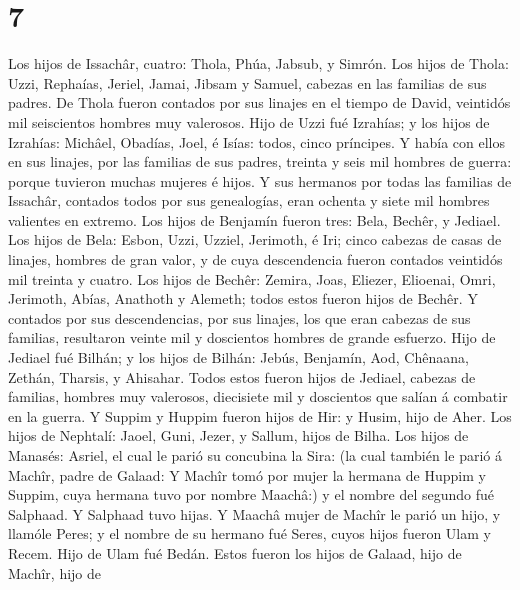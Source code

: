 \hypertarget{section-6}{%
\section{7}\label{section-6}}

 Los hijos de Issachâr, cuatro: Thola, Phúa, Jabsub, y
Simrón.  Los hijos de Thola: Uzzi, Rephaías, Jeriel,
Jamai, Jibsam y Samuel, cabezas en las familias de sus padres. De Thola
fueron contados por sus linajes en el tiempo de David, veintidós mil
seiscientos hombres muy valerosos.  Hijo de Uzzi fué
Izrahías; y los hijos de Izrahías: Michâel, Obadías, Joel, é Isías:
todos, cinco príncipes.  Y había con ellos en sus linajes,
por las familias de sus padres, treinta y seis mil hombres de guerra:
porque tuvieron muchas mujeres é hijos.  Y sus hermanos
por todas las familias de Issachâr, contados todos por sus genealogías,
eran ochenta y siete mil hombres valientes en extremo. 
Los hijos de Benjamín fueron tres: Bela, Bechêr, y Jediael.
 Los hijos de Bela: Esbon, Uzzi, Uzziel, Jerimoth, é Iri;
cinco cabezas de casas de linajes, hombres de gran valor, y de cuya
descendencia fueron contados veintidós mil treinta y cuatro.
 Los hijos de Bechêr: Zemira, Joas, Eliezer, Elioenai,
Omri, Jerimoth, Abías, Anathoth y Alemeth; todos estos fueron hijos de
Bechêr.  Y contados por sus descendencias, por sus
linajes, los que eran cabezas de sus familias, resultaron veinte mil y
doscientos hombres de grande esfuerzo.  Hijo de Jediael
fué Bilhán; y los hijos de Bilhán: Jebús, Benjamín, Aod, Chênaana,
Zethán, Tharsis, y Ahisahar.  Todos estos fueron hijos de
Jediael, cabezas de familias, hombres muy valerosos, diecisiete mil y
doscientos que salían á combatir en la guerra.  Y Suppim
y Huppim fueron hijos de Hir: y Husim, hijo de Aher.  Los
hijos de Nephtalí: Jaoel, Guni, Jezer, y Sallum, hijos de Bilha.
 Los hijos de Manasés: Asriel, el cual le parió su
concubina la Sira: (la cual también le parió á Machîr, padre de Galaad:
 Y Machîr tomó por mujer la hermana de Huppim y Suppim,
cuya hermana tuvo por nombre Maachâ:) y el nombre del segundo fué
Salphaad. Y Salphaad tuvo hijas.  Y Maachâ mujer de
Machîr le parió un hijo, y llamóle Peres; y el nombre de su hermano fué
Seres, cuyos hijos fueron Ulam y Recem.  Hijo de Ulam fué
Bedán. Estos fueron los hijos de Galaad, hijo de Machîr, hijo de
